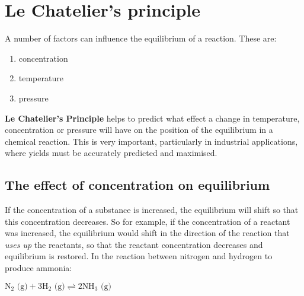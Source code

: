 



\section{Le Chatelier's principle}
\label{sec:reactionrates:lechatelier}

A number of factors can influence the equilibrium of a reaction. These are:
\begin{enumerate}
\item concentration
\item temperature
\item pressure
\end{enumerate}

\textbf{Le Chatelier's Principle} helps to predict what effect a change in temperature, concentration or pressure will have on the position of the equilibrium in a chemical reaction. This is very important, particularly in industrial applications, where yields must be accurately predicted and maximised.


\subsection{The effect of concentration on equilibrium}

If the concentration of a substance is increased, the equilibrium will shift so that this concentration decreases. So for example, if the concentration of a reactant was increased, the equilibrium would shift in the direction of the reaction that \textit{uses up} the reactants, so that the reactant concentration decreases and equilibrium is restored. In the reaction between nitrogen and hydrogen to produce ammonia:

\begin{center}
$\text{N}_{2}\text{ (g)} + 3\text{H}_{2}\text{ (g)} \rightleftharpoons 2\text{NH}_{3}\text{ (g)}$ 
\end{center}

